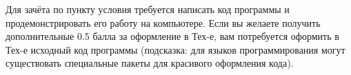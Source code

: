 \documentclass[10pt,a4paper,oneside]{article}
\begin{document}
\begin{enumerate}
Для зачёта по пункту условия требуется написать код программы и продемонстрировать его работу на компьютере.
Если вы желаете получить дополнительные 0.5 балла за оформление в Тех-е, вам потребуется оформить в Тех-е 
исходный код программы (подсказка: для языков программирования могут существовать специальные пакеты
для красивого оформления кода).

\end{enumerate}
\end{document}
